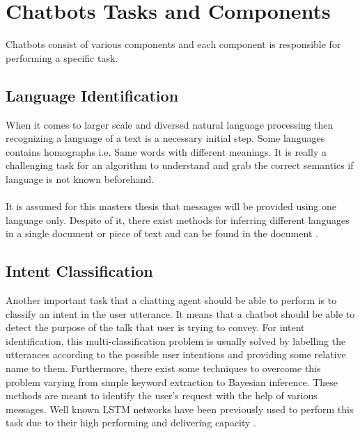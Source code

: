 \section{Chatbots Tasks and Components}
Chatbots consist of various components and each component is responsible for performing a specific task.

\subsection{Language Identification}
When it comes to larger scale and diversed natural language processing then recognizing a language of a text is a necessary initial step. Some languages contains homographs i.e. Same words with different meanings. It is really a challenging task for an algorithm to understand and grab the correct semantics if language is not known beforehand. \cite{designandimplementation}
\\~\\
It is assumed for this masters thesis that messages will be provided using one language only. Despite of it, there exist methods for inferring different languages in a single document or piece of text and can be found in the document \cite{multilanguagedetection}.

\subsection{Intent Classification}
Another important task that a chatting agent should be able to perform is to classify an intent in the user utterance. It means that a chatbot should be able to detect the purpose of the talk that user is trying to convey. For intent identification, this multi-classification problem is usually solved by labelling the utterances according to the possible user intentions and providing some relative name to them. Furthermore, there exist some techniques to overcome this problem varying from simple keyword extraction to Bayesian inference. These methods are meant to identify the user's request with the help of various messages. Well known LSTM\cite{lstm} networks have been previously used to perform this task due to their high performing and delivering capacity \cite{intentclassificationusinglstm}. \cite{designandimplementation}

